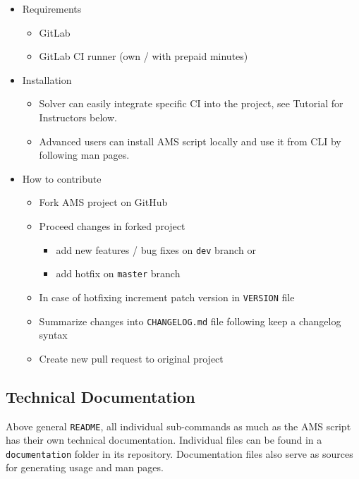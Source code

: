 \begin{itemize}
\item
  {Requirements}
  \begin{itemize}
  \item
    {GitLab}
  \item
    {GitLab CI runner (own / with prepaid minutes)}
  \end{itemize}

\item
  {Installation}
  \begin{itemize}
  \item
    {Solver can easily integrate specific CI into the project, see Tutorial for Instructors below.}
  \item
    {Advanced users can install AMS script locally and use it from CLI by following man pages.}
  \end{itemize}

\item
  {How to contribute}
  \begin{itemize}
  \item
    {Fork AMS project on GitHub}
  \item
    {Proceed changes in forked project}
    \begin{itemize}
    \item
      {add new features / bug fixes on \texttt{dev} branch or}
    \item
      {add hotfix on \texttt{master} branch}
    \end{itemize}
  \item
    {In case of hotfixing increment patch version in \texttt{VERSION} file}
  \item
    {Summarize changes into \texttt{CHANGELOG.md} file following keep a changelog syntax}
  \item
    {Create new pull request to original project}
  \end{itemize}
\end{itemize}

\subsection{Technical Documentation}\label{ssec:techdoc}

{Above general \texttt{README}, all individual sub-commands as much as the AMS script has their own technical documentation. Individual files can be found in a \texttt{documentation} folder in its repository. Documentation files also serve as sources for generating usage and man pages.}

